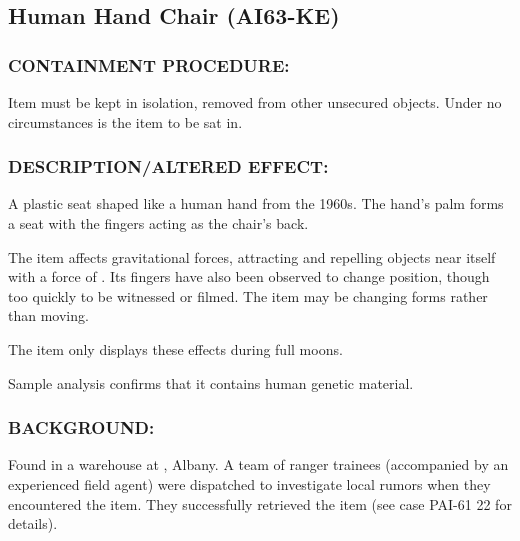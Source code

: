 \subsection*{Human Hand Chair (AI63-KE)}
\subsubsection*{CONTAINMENT PROCEDURE:}
\par Item must be kept in isolation, removed
from other unsecured objects. Under no
circumstances is the item to be sat in.
\subsubsection*{DESCRIPTION/ALTERED EFFECT:}
\par A plastic seat shaped like a human hand
from the 1960s. The hand's palm forms
a seat with the fingers acting as the
chair's back.
\par The item affects gravitational forces, attracting and repelling
objects near itself with a force of . Its fingers have also
been observed to change position, though too quickly to be
witnessed or filmed. The item may be changing forms rather than
moving.
\par The item only displays these effects during full moons.
\par Sample analysis confirms that it contains human genetic material.
\subsubsection*{BACKGROUND:}
\par Found in a warehouse at 
, Albany. A team of ranger trainees (accompanied by an experienced field
agent) were dispatched to investigate local rumors when they
encountered the item. They successfully retrieved the item (see
case PAI-61 22 for details).